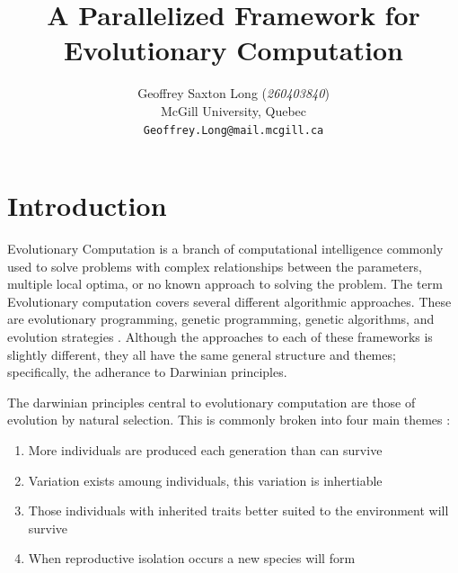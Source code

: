 \documentclass[10pt,letterpaper]{article}
\begin{document}
\title{A Parallelized Framework for Evolutionary Computation}

\author{
	Geoffrey Saxton Long (\textit{260403840})\\
	McGill University, Quebec \\
	{\tt\small Geoffrey.Long@mail.mcgill.ca}
}

\maketitle




\section{Introduction}
Evolutionary Computation is a branch of computational intelligence commonly used to solve problems with complex relationships between the parameters, multiple local optima, or no known approach to solving the problem. The term Evolutionary computation covers several different algorithmic approaches. These are evolutionary programming, genetic programming, genetic algorithms, and evolution strategies \cite{ecomp}. Although the approaches to each of these frameworks is slightly different, they all have the same general structure and themes; specifically, the adherance to Darwinian principles. 

The darwinian principles central to evolutionary computation are those of evolution by natural selection. This is commonly broken into four main themes \cite{naturalselection,naturalselection2}:
\begin{enumerate}
\item More individuals are produced each generation than can survive
\item Variation exists amoung individuals, this variation is inhertiable
\item Those individuals with inherited traits better suited to the environment will survive
\item When reproductive isolation occurs a new species will form
\end{enumerate}
\end{document}
